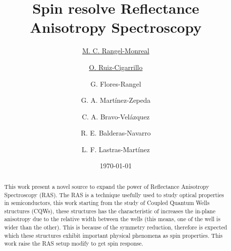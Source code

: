 \documentclass[reprint,aps,prb,citeautoscript,altaffilletter]{revtex4-2}
\begin{document}
	
	
	\title{Spin resolve Reflectance Anisotropy Spectroscopy }
	\author{\underline{M. C. Rangel-Monreal}}
	\author{\underline{O. Ruiz-Cigarrillo}}
	\author{G. Flores-Rangel}
	\author{G. A. Mart\'inez-Zepeda }
	\author{C. A. Bravo-Vel\'azquez}
	\author{R. E. Balderas-Navarro}
	\author{L. F. Lastras-Mart\'inez}
	
	\date{\today}
	
	\begin{abstract}
		This work present a novel source to expand the power of Reflectance Anisotropy Spectroscopy (RAS). The RAS is a technique usefully used to study optical properties in semiconductors, this work starting from the study of Coupled Quantum Wells structures (CQWs), these structures has the characteristic of  increases the in-plane anisotropy due to the relative width between the wells (this means, one of the well is wider than the other). This is because of the symmetry reduction, therefore is expected which these structures exhibit important physical phenomena as spin properties. This work raise the RAS setup modify to get spin response.   
	\end{abstract}
	
	\maketitle
	

	
%
%
	
\end{document}
